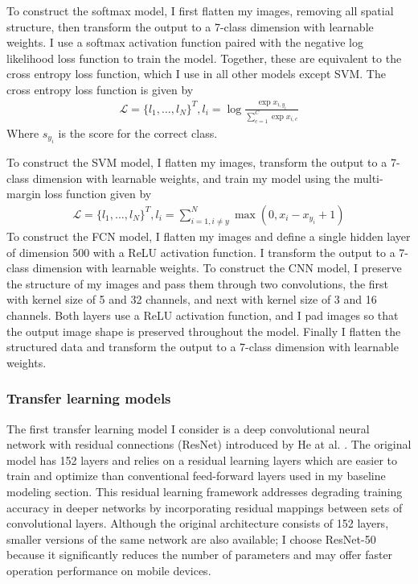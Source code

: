 \documentclass[10pt,twocolumn,letterpaper]{article}
\begin{document}
To construct the softmax model, I first flatten my images, removing all spatial structure, then transform the output to a 7-class dimension with learnable weights. I use a softmax activation function paired with the negative log likelihood loss function to train the model. Together, these are equivalent to the cross entropy loss function, which I use in all other models except SVM. The cross entropy loss function is given by
\begin{align}
  \mathcal{L} = \{l_1, \dots, l_N\}^T, l_i = \log\frac{\exp{x_{i, y_i}}}{\sum_{c=1}^C\exp{x_{i,c}}}
\end{align}
Where $s_{y_i}$ is the score for the correct class. 

To construct the SVM model, I flatten my images, transform the output to a 7-class dimension with learnable weights, and train my model using the multi-margin loss function given by
\begin{align}
  \mathcal{L} = \{l_1, \dots, l_N\}^T, l_i = \sum_{i=1, i\neq y}^N \max(0, x_{i} - x_{y_i} + 1)
\end{align}
To construct the FCN model, I flatten my images and define a single hidden layer of dimension 500 with a ReLU activation function. I transform the output to a 7-class dimension with learnable weights. To construct the CNN model, I preserve the structure of my images and pass them through two convolutions, the first with kernel size of 5 and 32 channels, and next with kernel size of 3 and 16 channels. Both layers use a ReLU activation function, and I pad images so that the output image shape is preserved throughout the model. Finally I flatten the structured data and transform the output to a 7-class dimension with learnable weights. 

\subsubsection{Transfer learning models}
The first transfer learning model I consider is a deep convolutional neural network with residual connections (ResNet) introduced by He at al. \cite{ResNET}. The original model has 152 layers and relies on a residual learning layers which are easier to train and optimize than conventional feed-forward layers used in my baseline modeling section. This residual learning framework addresses degrading training accuracy in deeper networks by incorporating residual mappings between sets of convolutional layers. Although the original architecture consists of 152 layers, smaller versions of the same network are also available; I choose ResNet-50 because it significantly reduces the number of parameters and may offer faster operation performance on mobile devices. 
\end{document}
